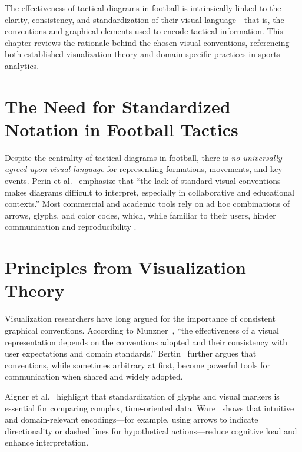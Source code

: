 \documentclass[11pt,a4paper,openright]{report}
\begin{document}
The effectiveness of tactical diagrams in football is intrinsically linked to the clarity, consistency, and standardization of their visual language---that is, the conventions and graphical elements used to encode tactical information. This chapter reviews the rationale behind the chosen visual conventions, referencing both established visualization theory and domain-specific practices in sports analytics.

\section{The Need for Standardized Notation in Football Tactics}
Despite the centrality of tactical diagrams in football, there is \textit{no universally agreed-upon visual language} for representing formations, movements, and key events. Perin et al.\ \cite{perin2013soccerstories} emphasize that ``the lack of standard visual conventions makes diagrams difficult to interpret, especially in collaborative and educational contexts.'' Most commercial and academic tools rely on ad hoc combinations of arrows, glyphs, and color codes, which, while familiar to their users, hinder communication and reproducibility \cite{sarmento2014match, perin2013soccerstories}.

\section{Principles from Visualization Theory}
Visualization researchers have long argued for the importance of consistent graphical conventions. According to Munzner~\cite{munzner2014visualization}, ``the effectiveness of a visual representation depends on the conventions adopted and their consistency with user expectations and domain standards.'' Bertin~\cite{bertin2011semiology} further argues that conventions, while sometimes arbitrary at first, become powerful tools for communication when shared and widely adopted.

Aigner et al.\ \cite{aigner2007visualizing} highlight that standardization of glyphs and visual markers is essential for comparing complex, time-oriented data. Ware~\cite{ware2013information} shows that intuitive and domain-relevant encodings---for example, using arrows to indicate directionality or dashed lines for hypothetical actions---reduce cognitive load and enhance interpretation.
\end{document}
